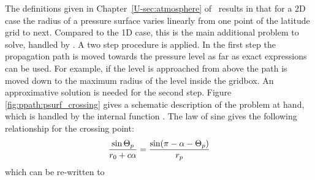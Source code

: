 The definitions given in Chapter~\ref{U-sec:atmosphere} of \user\ results in
that for a 2D case the radius of a pressure surface varies linearly from one
point of the latitude grid to next. Compared to the 1D case, this is the main
additional problem to solve, handled by . A two
step procedure is applied. In the first step the propagation path is moved
towards the pressure level as far as exact expressions can be used. For
example, if the level is approached from above the path is moved down to the
maximum radius of the level inside the gridbox. An approximative solution is
needed for the second step. Figure \ref{fig:ppath:psurf_crossing} gives a
schematic description of the problem at hand, which is handled by the internal
function .
The law of sine gives the following relationship for the crossing
point:
\begin{equation}
  \frac{\sin\Theta_p}{r_{0}+c\alpha} = 
                                \frac{\sin(\pi-\alpha-\Theta_p)}{r_{p}}
\end{equation}
which can be re-written to

